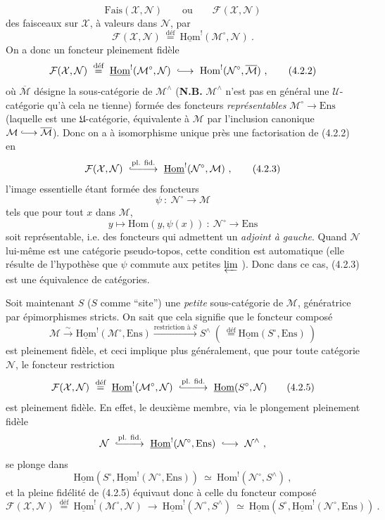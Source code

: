 \documentclass[11pt]{article}
\newcommand{\printedpage}[1]{\if\relax\detokenize{#1}\relax\else\marginpar{\footnotesize p.~#1}\fi}
\newcommand{\msp}[1]{\marginpar{\footnotesize [#1]}}
\newcommand{\uHom}{\underline{\mathrm{Hom}}}
\newcommand{\Ens}{\mathrm{Ens}}
\newcommand{\cM}{\mathcal{M}}
\newcommand{\cN}{\mathcal{N}}
\newcommand{\cX}{\mathcal{X}}
\newcommand{\cF}{\mathcal{F}}
\newcommand{\Hom}{\mathrm{Hom}}
\newcommand{\defeq}{\overset{\text{déf}}{=}}
\newcommand{\linj}{\lhook\joinrel\longrightarrow}
\begin{document}
\msp{page 58}
\[
\mathrm{Fais}(\cX,\cN) \qquad \text{ou} \qquad \cF(\cX,\cN)
\]
des faisceaux sur $\cX$, à valeurs dans $\cN$, par
\[
\cF(\cX,\cN) \ \defeq\ \uHom^{!}(\cM^{\circ},\cN) \ .
\tag*{(4.2.1)}
\]
On a donc un foncteur pleinement fidèle
\[
\cF(\cX,\cN) \ \defeq\ \uHom^{!}(\cM^{\circ},\cN) \ \linj\ \Hom^{!}(\cN^{\circ},\overline{\cM}) \ ,
\tag*{(4.2.2)}
\]
où $\overline{\cM}$ désigne la sous-catégorie de $\cM^{\wedge}$ (\textbf{N.B.} $\cM^{\wedge}$ n'est pas en général une $\mathcal{U}$-catégorie qu'à cela ne tienne) formée des foncteurs \textit{représentables} $\cM^{\circ}\longrightarrow\Ens$ (laquelle est une $\mathfrak{U}$-catégorie, équivalente à $\cM$ par l'inclusion canonique $\cM \linj \overline{\cM}$). Donc on a à isomorphisme unique près une factorisation de (4.2.2) en
\[
\cF(\cX,\cN) \ \overset{\text{pl. fid.}}{\lhook\joinrel\relbar\joinrel\relbar\joinrel\longrightarrow}\ \uHom^{!}(\cN^{\circ},\cM) \ ,
\tag*{(4.2.3)}
\]
l'image essentielle étant formée des foncteurs
\[
\psi \ :\ \cN^{\circ} \longrightarrow \cM
\]
tels que pour tout $x$ dans $\cM$,
\[
y \longmapsto \Hom(y,\psi(x)) \ :\ \cN^{\circ} \longrightarrow \Ens
\]
soit représentable, i.e. des foncteurs qui
\printedpage{5}
\msp{page 59}
admettent un \textit{adjoint à gauche}. Quand $\cN$ lui-même est une catégorie pseudo-topos, cette condition est automatique (elle résulte de l'hypothèse que $\psi$ commute aux petites $\varprojlim$ ). Donc dans ce cas, (4.2.3) est une équivalence de catégories.

Soit maintenant $S$ ($S$ comme “site”) une \textit{petite} sous-catégorie de $\cM$, génératrice par épimorphismes stricts. On sait que cela signifie que le foncteur composé
\[
\cM \xrightarrow{\ \sim\ } \uHom^{!}(\cM^{\circ},\Ens) \xrightarrow{\text{restriction à } S} S^{\wedge} \ (\ \defeq \uHom(S^{\circ},\Ens)\ )
\tag*{(4.2.4)}
\]
est pleinement fidèle, et ceci implique plus généralement, que pour toute catégorie $\cN$, le foncteur restriction
\[
\cF(\cX,\cN) \ \defeq\ \uHom^{!}(\cM^{\circ},\cN) \ \overset{\text{pl. fid.}}{\lhook\joinrel\relbar\joinrel\relbar\joinrel\longrightarrow}\ \uHom(S^{\circ},\cN)
\tag*{(4.2.5)}
\]
est pleinement fidèle. En effet, le deuxième membre, via le plongement pleinement fidèle
\[
\cN \ \overset{\text{pl. fid.}}{\lhook\joinrel\relbar\joinrel\relbar\joinrel\longrightarrow}\ \uHom^{!}(\cN^{\circ},\Ens) \ \linj\ \cN^{\wedge} \ ,
\]
se plonge dans
\[
\uHom(S^{\circ},\uHom^{!}(\cN^{\circ},\Ens)) \ \simeq\ \Hom^{!}(\cN^{\circ},S^{\wedge}) \ ,
\]
et la pleine fidélité de (4.2.5) équivaut donc à celle du foncteur composé
\[
\cF(\cX,\cN) \ \defeq\ \uHom^{!}(\cM^{\circ},\cN) \ \longrightarrow\ \uHom^{!}(\cN^{\circ},S^{\wedge}) \ \simeq\ \uHom(S^{\circ},\uHom^{!}(\cN^{\circ},\Ens)) \ .
\tag*{(4.2.6)}
\]
\end{document}
